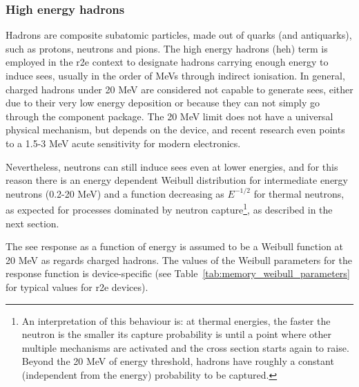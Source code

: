 \documentclass[encoding=utf8,british]{tumphthesis}
\begin{document}
\subsubsection{High energy hadrons}

Hadrons are composite subatomic particles, made out of quarks (and antiquarks), such as protons, neutrons and pions. The high energy hadrons (\acrshort{heh}) term is employed in the \acrshort{r2e} context to designate hadrons carrying enough energy to induce \acrshort{see}s, usually in the order of MeVs through indirect ionisation. In general, charged hadrons under 20 MeV are considered not capable to generate \acrshort{see}s, either due to their very low energy deposition or because they can not simply go through the component package.  The 20 MeV limit does not have a universal physical mechanism, but depends on the device, and recent research \cite{bosser:tel-01952831} even points to a 1.5-3 MeV acute sensitivity for modern electronics.

Nevertheless, neutrons can still induce \acrshort{see}s even at lower energies, and for this reason there is an energy dependent Weibull distribution for intermediate energy neutrons (0.2-20 MeV) and a function decreasing as $E^{-1/2}$ for thermal neutrons, as expected for processes dominated by neutron capture\footnote{An interpretation of this behaviour is: at thermal energies, the faster the neutron is the smaller its capture probability is until a point where other multiple mechanisms are activated and the cross section starts again to raise. Beyond the 20 MeV of energy threshold, hadrons have roughly a constant (independent from the energy) probability to be captured.}, as described in the next section. 

The \acrshort{see} response as a function of energy is assumed to be a Weibull function at 20 MeV as regards charged  hadrons. The values of the Weibull parameters for the response function is device-specific (see Table~\ref{tab:memory_weibull_parameters} for typical values for \acrshort{r2e} devices). 
\end{document}
